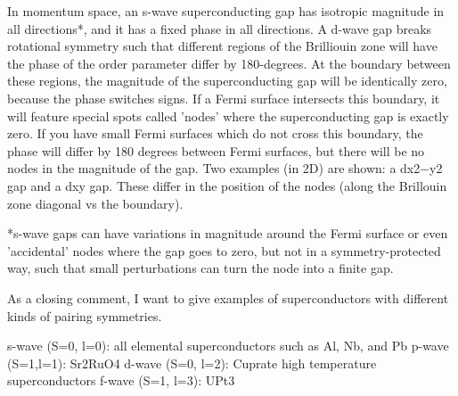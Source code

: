 \documentclass[a4paper,10pt]{article}
\begin{document}
In momentum space, an s-wave superconducting gap has isotropic magnitude in all directions*, and it has a fixed phase in all directions. A d-wave gap breaks rotational symmetry such that different regions of the Brilliouin zone will have the phase of the order parameter differ by 180-degrees. At the boundary between these regions, the magnitude of the superconducting gap will be identically zero, because the phase switches signs. If a Fermi surface intersects this boundary, it will feature special spots called 'nodes' where the superconducting gap is exactly zero. If you have small Fermi surfaces which do not cross this boundary, the phase will differ by 180 degrees between Fermi surfaces, but there will be no nodes in the magnitude of the gap. Two examples (in 2D) are shown: a dx2−y2
gap and a dxy gap. These differ in the position of the nodes (along the Brillouin zone diagonal vs the boundary).

*s-wave gaps can have variations in magnitude around the Fermi surface or even 'accidental' nodes where the gap goes to zero, but not in a symmetry-protected way, such that small perturbations can turn the node into a finite gap.

As a closing comment, I want to give examples of superconductors with different kinds of pairing symmetries.

    s-wave (S=0, l=0): all elemental superconductors such as Al, Nb, and Pb
    p-wave (S=1,l=1): Sr2RuO4
    d-wave (S=0, l=2): Cuprate high temperature superconductors
    f-wave (S=1, l=3): UPt3
\end{document}
